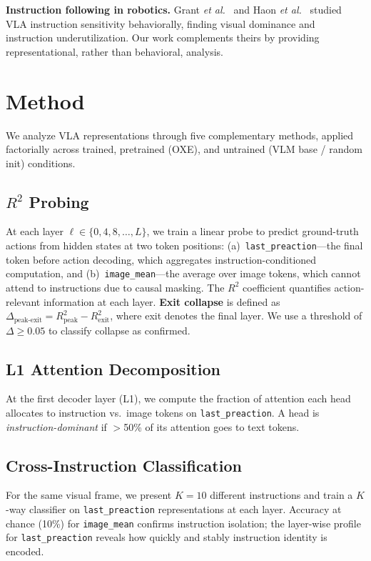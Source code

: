 \documentclass[10pt,twocolumn]{article}
\newcommand{\etal}{\textit{et al.}}
\begin{document}
\textbf{Instruction following in robotics.}
Grant \etal~\cite{grant2026} and Haon \etal~\cite{haon2025} studied VLA instruction sensitivity behaviorally, finding visual dominance and instruction underutilization. Our work complements theirs by providing representational, rather than behavioral, analysis.

\section{Method}
\label{sec:method}

We analyze VLA representations through five complementary methods, applied factorially across trained, pretrained (OXE), and untrained (VLM base / random init) conditions.

\subsection{$R^2$ Probing}
\label{sec:r2probe}
At each layer $\ell \in \{0, 4, 8, \ldots, L\}$, we train a linear probe to predict ground-truth actions from hidden states at two token positions: (a)~\texttt{last\_preaction}---the final token before action decoding, which aggregates instruction-conditioned computation, and (b)~\texttt{image\_mean}---the average over image tokens, which cannot attend to instructions due to causal masking.
The $R^2$ coefficient quantifies action-relevant information at each layer.
\textbf{Exit collapse} is defined as $\Delta_{\text{peak-exit}} = R^2_{\text{peak}} - R^2_{\text{exit}}$, where exit denotes the final layer. We use a threshold of $\Delta \geq 0.05$ to classify collapse as confirmed.

\subsection{L1 Attention Decomposition}
At the first decoder layer (L1), we compute the fraction of attention each head allocates to instruction vs.\ image tokens on \texttt{last\_preaction}. A head is \emph{instruction-dominant} if $>$50\% of its attention goes to text tokens.

\subsection{Cross-Instruction Classification}
For the same visual frame, we present $K=10$ different instructions and train a $K$-way classifier on \texttt{last\_preaction} representations at each layer. Accuracy at chance (10\%) for \texttt{image\_mean} confirms instruction isolation; the layer-wise profile for \texttt{last\_preaction} reveals how quickly and stably instruction identity is encoded.
\end{document}
